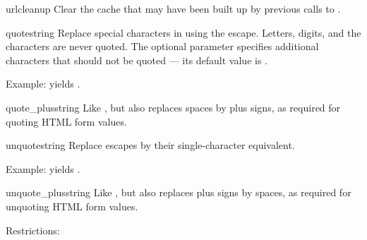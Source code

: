 \begin{funcdesc}{urlcleanup}{}
Clear the cache that may have been built up by previous calls to
.
\end{funcdesc}

\begin{funcdesc}{quote}{string}
Replace special characters in  using the  escape.
Letters, digits, and the characters  are never quoted.
The optional  parameter specifies additional characters
that should not be quoted --- its default value is .

Example:  yields .
\end{funcdesc}

\begin{funcdesc}{quote_plus}{string}
Like , but also replaces spaces by plus signs, as
required for quoting HTML form values.
\end{funcdesc}

\begin{funcdesc}{unquote}{string}
Replace  escapes by their single-character equivalent.

Example:  yields .
\end{funcdesc}

\begin{funcdesc}{unquote_plus}{string}
Like , but also replaces plus signs by spaces, as
required for unquoting HTML form values.
\end{funcdesc}

Restrictions:


